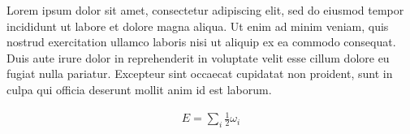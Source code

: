 \documentclass[a4paper,twoside,12pt,fleqn]{book}
\begin{document}
\pagestyle{plain}

Lorem ipsum dolor sit amet, consectetur adipiscing elit, sed do eiusmod tempor incididunt ut labore et dolore magna aliqua. 
Ut enim ad minim veniam, quis nostrud exercitation ullamco laboris nisi ut aliquip ex ea commodo consequat.
Duis aute irure dolor in reprehenderit in voluptate velit esse cillum dolore eu fugiat nulla pariatur.
Excepteur sint occaecat cupidatat non proident, sunt in culpa qui officia deserunt mollit anim id est laborum.

\begin{align}
  E = \sum_i \frac 1 2 \omega_i
\end{align}
\end{document}
